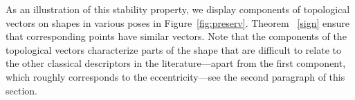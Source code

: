 As an illustration of this stability property, we display components
of topological vectors on shapes in various poses 
in Figure~\ref{fig:preserv}. 
Theorem%
~\ref{sign}  
ensure that corresponding points have similar vectors. 
Note that the components of the topological vectors characterize parts of the shape that are difficult to relate to 
the other classical descriptors in the literature---apart from the first component, which roughly corresponds to the eccentricity---see
the second paragraph of this section. 

